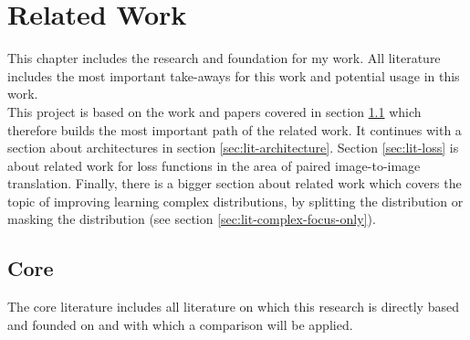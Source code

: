 \chapter{Related Work}
\label{cha:literature}


	This chapter includes the research and foundation for my work. All literature includes the most important take-aways for this work and potential usage in this work.\\
	This project is based on the work and papers covered in section \ref{sec:lit-core} which therefore builds the most important path of the related work.
	It continues with a section about architectures in section \ref{sec:lit-architecture}. Section \ref{sec:lit-loss} is about related work for loss functions in the area of  paired image-to-image translation. Finally, there is a bigger section about related work which covers the topic of improving learning complex distributions, by splitting the distribution or masking the distribution (see section \ref{sec:lit-complex-focus-only}).


	\section{Core}
	\label{sec:lit-core}
		The core literature includes all literature on which this research is directly based and founded on and with which a comparison will be applied.
		
